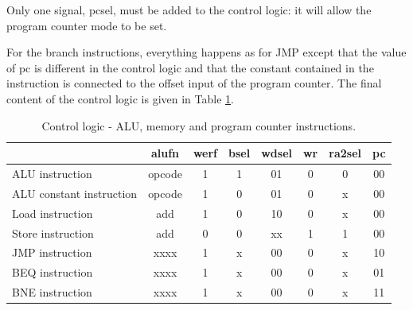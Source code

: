 Only one signal, pcsel, must be added to the control logic: it will allow the program 
counter mode to be set.

For the branch instructions, everything happens as for JMP except that the value of pc is different 
in the control logic and that the constant contained in the instruction is connected to the offset 
input of the program counter. The final content of the control logic is given in Table \ref{tab:cl/all}.

\begin{table}[H]
    \centering
    \begin{tabular}{|l|c|c|c|c|c|c|c|}
    \hline
    \rowcolor[HTML]{DAE8FC} 
    \multicolumn{1}{|c|}{\cellcolor[HTML]{DAE8FC}\textbf{Instruction}} & \textbf{alufn} & \textbf{werf} & \textbf{bsel} & \textbf{wdsel} & \textbf{wr} & \textbf{ra2sel} & \textbf{pc} \\ \hline
    ALU instruction                                                    & opcode         & 1             & 1             & 01             & 0           & 0               & 00          \\ \hline
    ALU constant instruction                                           & opcode         & 1             & 0             & 01             & 0           & x               & 00          \\ \hline
    Load instruction                                                   & add            & 1             & 0             & 10             & 0           & x               & 00          \\ \hline
    Store instruction                                                  & add            & 0             & 0             & xx             & 1           & 1               & 00          \\ \hline
    JMP instruction                                                    & xxxx           & 1             & x             & 00             & 0           & x               & 10          \\ \hline
    BEQ instruction                                                    & xxxx           & 1             & x             & 00             & 0           & x               & 01          \\ \hline
    BNE instruction                                                    & xxxx           & 1             & x             & 00             & 0           & x               & 11          \\ \hline
    \end{tabular}
    \caption{Control logic - ALU, memory and program counter instructions.}
    \label{tab:cl/all}
\end{table}


